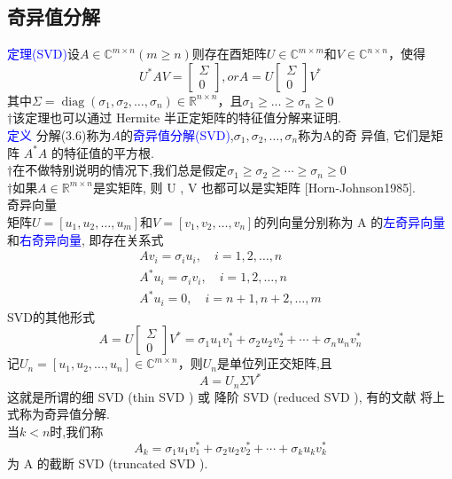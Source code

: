 \documentclass[12pt,a4paper]{article}
\begin{document}
\subsection{奇异值分解}
\textcolor{blue}{定理(SVD)}设$A \in \mathbb{C}^{m \times n}(m \geq n)$则存在酉矩阵$U \in \mathbb{C}^{m \times m}$和$V \in \mathbb{C}^{n \times n}$，使得
\begin{equation}
U^{*} A V=\left[\begin{array}{l}{\Sigma} \\ {0}\end{array}\right],orA=U\left[\begin{array}{l}{\Sigma} \\ {0}\end{array}\right] V^{*}
\end {equation}
其中$\Sigma=\operatorname{diag}\left(\sigma_{1}, \sigma_{2}, \ldots, \sigma_{n}\right) \in \mathbb{R}^{n \times n}$，且$\sigma_{1} \geq \ldots \geq \sigma_{n} \geq 0$\\

$\dagger$该定理也可以通过 Hermite 半正定矩阵的特征值分解来证明.\\

\textcolor{blue}{定义} 分解(3.6)称为$A$的\textcolor{blue}{奇异值分解(SVD)},$\sigma_{1}, \sigma_{2}, \dots, \sigma_{n}$称为A的奇 异值, 它们是矩阵 $A^{*}A$ 的特征值的平方根.\\

$\dagger$在不做特别说明的情况下,我们总是假定$\sigma_{1} \geq \sigma_{2} \geq \cdots \geq \sigma_{n} \geq 0$\\
$\dagger$如果$A \in \mathbb{R}^{m \times n}$是实矩阵, 则 U , V 也都可以是实矩阵 [Horn-Johnson1985].\\

\noindent 奇异向量\\
矩阵$U=\left[u_{1}, u_{2}, \ldots, u_{m}\right]$和$V=\left[v_{1}, v_{2}, \ldots, v_{n}\right]$的列向量分别称为 A 的\textcolor{blue}{左奇异向量}和\textcolor{blue}{右奇异向量}, 即存在关系式
$$
\begin{array}{l}{A v_{i}=\sigma_{i} u_{i}, \quad i=1,2, \ldots, n} \\ {A^{*} u_{i}=\sigma_{i} v_{i}, \quad i=1,2, \ldots, n} \\ {A^{*} u_{i}=0, \quad i=n+1, n+2, \ldots, m}\end{array}
$$
SVD的其他形式\\
$$
A=U\left[\begin{array}{l}{\Sigma} \\ {0}\end{array}\right] V^{*}=\sigma_{1} u_{1} v_{1}^{*}+\sigma_{2} u_{2} v_{2}^{*}+\cdots+\sigma_{n} u_{n} v_{n}^{*}
$$
记$U_{n}=\left[u_{1}, u_{2}, \ldots, u_{n}\right] \in \mathbb{C}^{m \times n}$，则$U_{n}$是单位列正交矩阵,且
\begin{equation}
A=U_{n} \Sigma V^{*}
\end{equation}
这就是所谓的细 SVD (thin SVD ) 或 降阶 SVD (reduced SVD ), 有的文献 将上式称为奇异值分解.\\
当$k < n$时,我们称
$$
A_{k}=\sigma_{1} u_{1} v_{1}^{*}+\sigma_{2} u_{2} v_{2}^{*}+\cdots+\sigma_{k} u_{k} v_{k}^{*}
$$
为 A 的截断 SVD (truncated SVD ).\\
\end{document}
